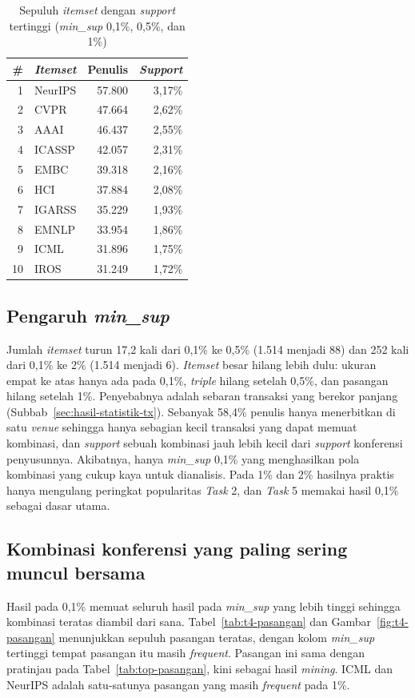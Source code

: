 \begin{table}[ht]
\caption{Sepuluh \textit{itemset} dengan \textit{support} tertinggi (\textit{min\_sup} 0,1\%, 0,5\%, dan 1\%)}
\label{tab:t4-top10}
\small
\begin{tabular}{@{}rlrr@{}}
\toprule
\textbf{\#} & \textbf{\textit{Itemset}} & \textbf{Penulis} & \textbf{\textit{Support}} \\
\midrule
1 & NeurIPS & 57.800 & 3,17\% \\
2 & CVPR & 47.664 & 2,62\% \\
3 & AAAI & 46.437 & 2,55\% \\
4 & ICASSP & 42.057 & 2,31\% \\
5 & EMBC & 39.318 & 2,16\% \\
6 & HCI & 37.884 & 2,08\% \\
7 & IGARSS & 35.229 & 1,93\% \\
8 & EMNLP & 33.954 & 1,86\% \\
9 & ICML & 31.896 & 1,75\% \\
10 & IROS & 31.249 & 1,72\% \\
\bottomrule
\end{tabular}
\end{table}

\subsection{Pengaruh \textit{min\_sup}}
\label{sec:hasil-t4-fp-minsup}
Jumlah \textit{itemset} turun 17,2 kali dari 0,1\% ke 0,5\% (1.514 menjadi 88) dan 252 kali dari 0,1\% ke 2\% (1.514 menjadi 6). \textit{Itemset} besar hilang lebih dulu: ukuran empat ke atas hanya ada pada 0,1\%, \textit{triple} hilang setelah 0,5\%, dan pasangan hilang setelah 1\%. Penyebabnya adalah sebaran transaksi yang berekor panjang (Subbab~\ref{sec:hasil-statistik-tx}). Sebanyak 58,4\% penulis hanya menerbitkan di satu \textit{venue} sehingga hanya sebagian kecil transaksi yang dapat memuat kombinasi, dan \textit{support} sebuah kombinasi jauh lebih kecil dari \textit{support} konferensi penyusunnya. Akibatnya, hanya \textit{min\_sup} 0,1\% yang menghasilkan pola kombinasi yang cukup kaya untuk dianalisis. Pada 1\% dan 2\% hasilnya praktis hanya mengulang peringkat popularitas \textit{Task} 2, dan \textit{Task} 5 memakai hasil 0,1\% sebagai dasar utama.

\subsection{Kombinasi konferensi yang paling sering muncul bersama}
\label{sec:hasil-t4-fp-kombinasi}
Hasil pada 0,1\% memuat seluruh hasil pada \textit{min\_sup} yang lebih tinggi sehingga kombinasi teratas diambil dari sana. Tabel~\ref{tab:t4-pasangan} dan Gambar~\ref{fig:t4-pasangan} menunjukkan sepuluh pasangan teratas, dengan kolom \textit{min\_sup} tertinggi tempat pasangan itu masih \textit{frequent}. Pasangan ini sama dengan pratinjau pada Tabel~\ref{tab:top-pasangan}, kini sebagai hasil \textit{mining}. ICML dan NeurIPS adalah satu-satunya pasangan yang masih \textit{frequent} pada 1\%.

